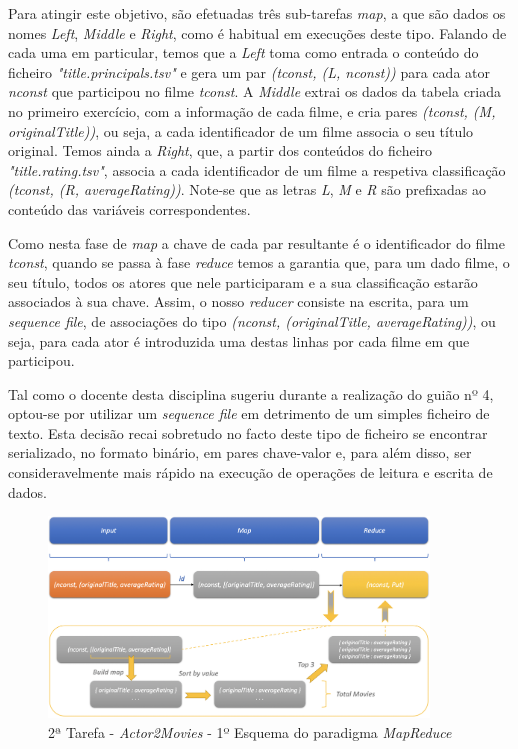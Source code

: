 \documentclass[a4paper]{report}
\begin{document}
{			Para atingir este objetivo, são efetuadas três sub-tarefas \textit{map}, a que são dados os nomes \textit{Left}, \textit{Middle} e \textit{Right}, como é habitual em execuções deste tipo. Falando de cada uma em particular, temos que a \textit{Left} toma como entrada o conteúdo do ficheiro \textit{"title.principals.tsv"} e gera um par \textit{(tconst, (L, nconst))} para cada ator \textit{nconst} que participou no filme \textit{tconst}. A \textit{Middle} extrai os dados da tabela criada no primeiro exercício, com a informação de cada filme, e cria pares \textit{(tconst, (M, originalTitle))}, ou seja, a cada identificador de um filme associa o seu título original. Temos ainda a \textit{Right}, que, a partir dos conteúdos do ficheiro \textit{"title.rating.tsv"}, associa a cada identificador de um filme a respetiva classificação \textit{(tconst, (R, averageRating))}.
			Note-se que as letras \textit{L}, \textit{M} e \textit{R} são prefixadas ao conteúdo das variáveis correspondentes.
			
			Como nesta fase de \textit{map} a chave de cada par resultante é o identificador do filme \textit{tconst}, quando se passa à fase \textit{reduce} temos a garantia que, para um dado filme, o seu título, todos os atores que nele participaram e a sua classificação estarão associados à sua chave. Assim, o nosso \textit{reducer} consiste na escrita, para um \textit{sequence file}, de associações do tipo \textit{(nconst, (originalTitle, averageRating))}, ou seja, para cada ator é introduzida uma destas linhas por cada filme em que participou.

			Tal como o docente desta disciplina sugeriu durante a realização do guião nº 4, optou-se por utilizar um \textit{sequence file} em detrimento de um simples ficheiro de texto. Esta decisão recai sobretudo no facto deste tipo de ficheiro se encontrar serializado, no formato binário, em pares chave-valor e, para além disso, ser consideravelmente mais rápido na execução de operações de leitura e escrita de dados.
			\begin{figure}[H]
				\centering
				\includegraphics[width=0.9\textwidth]{Images/Task 2 - Actor2Movies - (1) MapReduce.png}
				\caption{2ª Tarefa - \textit{Actor2Movies} - 1º Esquema do paradigma \textit{MapReduce}}
				\label{fig:19}
			\end{figure}

}
\end{document}

